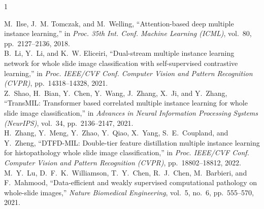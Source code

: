 \documentclass[journal]{IEEEtran}
\begin{document}
\begin{thebibliography}{1}

M.~Ilse, J.~M. Tomczak, and M.~Welling,
``Attention-based deep multiple instance learning,''
in \emph{Proc. 35th Int. Conf. Machine Learning (ICML)},
vol.~80, pp.~2127--2136, 2018. \\

B.~Li, Y.~Li, and K.~W. Eliceiri,
``Dual-stream multiple instance learning network for whole slide
image classification with self-supervised contrastive learning,''
in \emph{Proc. IEEE/CVF Conf. Computer Vision and Pattern
Recognition (CVPR)}, pp.~14318--14328, 2021. \\

Z.~Shao, H.~Bian, Y.~Chen, Y.~Wang, J.~Zhang,
X.~Ji, and Y.~Zhang,
``TransMIL: Transformer based correlated multiple
instance learning for whole slide image classification,''
in \emph{Advances in Neural Information Processing
Systems (NeurIPS)}, vol.~34, pp.~2136--2147, 2021. \\


H.~Zhang, Y.~Meng, Y.~Zhao, Y.~Qiao, X.~Yang,
S.~E.~Coupland, and Y.~Zheng,
``DTFD-MIL: Double-tier feature distillation
multiple instance learning for histopathology
whole slide image classification,''
in \emph{Proc. IEEE/CVF Conf. Computer Vision
and Pattern Recognition (CVPR)},
pp.~18802--18812, 2022. \\


M.~Y.~Lu, D.~F.~K.~Williamson, T.~Y.~Chen,
R.~J.~Chen, M.~Barbieri, and F.~Mahmood,
``Data-efficient and weakly supervised
computational pathology on whole-slide images,''
\emph{Nature Biomedical Engineering},
vol.~5, no.~6, pp.~555--570, 2021. \\





\end{thebibliography}
\end{document}
